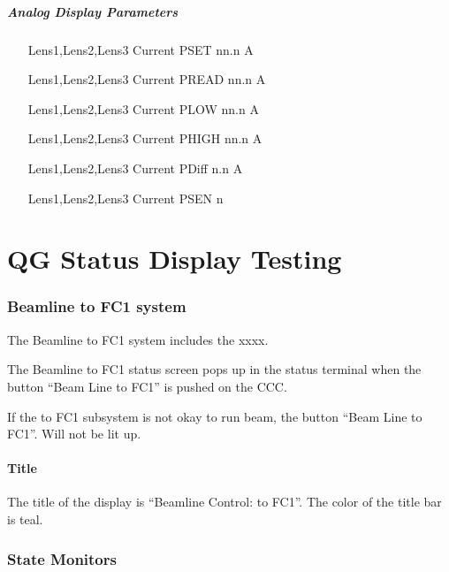 \documentclass[11pt]{book}		%
\begin{document}
\paragraph{Analog Display Parameters}

\begin{enumerate}
 \item [Lens1,Lens2,Lens3] Current PSET   nn.n A
 \item [Lens1,Lens2,Lens3] Current PREAD  nn.n A
 \item [Lens1,Lens2,Lens3] Current PLOW   nn.n A
 \item [Lens1,Lens2,Lens3] Current PHIGH  nn.n A
 \item [Lens1,Lens2,Lens3] Current PDiff n.n A
 \item [Lens1,Lens2,Lens3] Current PSEN  n
\end{enumerate}




\chapter{QG Status Display Testing}


\subsection{Beamline to FC1 system} \label{sect:cyc-op-interface-status-terminal-display-contents-beamline-fc1}

The Beamline to FC1 system includes the xxxx.

The Beamline to FC1 status screen pops up in the status terminal when the button ``Beam Line to FC1'' is pushed on the CCC.

If the to FC1 subsystem is not okay to run beam, the button ``Beam Line to FC1''. Will not be lit up.


\subsubsection{Title}\label{sect:cyc-op-interface-status-terminal-display-contents-beamline-fc1-title}

The title of the display is ``Beamline Control: to FC1''.  The color of the title bar is teal.

\subsection{State Monitors} \label{sect:cyc-op-interface-status-beamline-tofc1-state-monitors}
\end{document}
